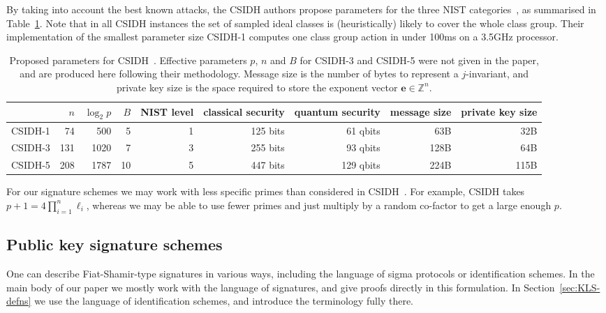 \documentclass{llncs}
\newcommand{\Z}{\mathbb{Z}}
\newcommand{\e}{\mathbf{e}}
\begin{document}
By taking into account the best known attacks, the CSIDH authors propose parameters for the three NIST categories~\cite{NIST2016}, as summarised in Table~\ref{tab:csidh-parms}.
Note that in all CSIDH instances the set of sampled ideal classes is (heuristically) likely to cover the whole class group.
Their implementation of the smallest parameter size CSIDH-1 computes one class group action in under 100ms on a 3.5GHz processor.


\begin{table}
  \centering
  \begin{tabular}{l | r | r | r | r | r | r | r | r}
    & $n$ & $\log_2 p$ & $B$ & NIST level & classical security & quantum security & message size & private key size \\
    \hline
    CSIDH-1 &  74 &  500 &  5 & 1 & 125 bits &  61 qbits &  63B &  32B\\
    CSIDH-3 & 131 & 1020 &  7 & 3 & 255 bits &  93 qbits & 128B &  64B\\
    CSIDH-5 & 208 & 1787 & 10 & 5 & 447 bits & 129 qbits & 224B & 115B
  \end{tabular}
  \caption{Proposed parameters for CSIDH~\cite{CLMPR18}.  Effective
    parameters $p$, $n$ and $B$ for CSIDH-3 and CSIDH-5 were not given
    in the paper, and are produced here following their methodology.
    Message size is the number of bytes to represent a $j$-invariant, and private key size is the space required to store the exponent vector $\e \in \Z^n$.}
  \label{tab:csidh-parms}
\end{table}




For our signature schemes we may work with less specific primes than considered in CSIDH~\cite{CLMPR18}. For example, CSIDH takes $p+1 = 4\prod_{i=1}^n\ell_i$, whereas we may be able to use fewer primes and just multiply by a random co-factor to get a large enough $p$.




\subsection{Public key signature schemes}

One can describe Fiat-Shamir-type signatures in various ways, including the language of sigma protocols or identification schemes.
In the main body of our paper we mostly work with the language of signatures, and give proofs directly in this formulation.
In Section~\ref{sec:KLS-defns} we use the language of identification schemes, and introduce the terminology fully there.
\end{document}
